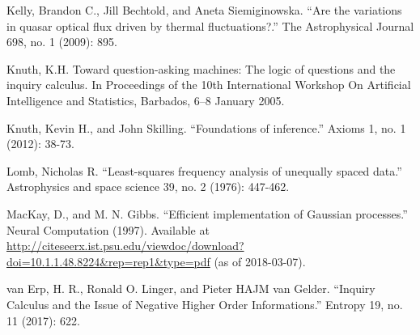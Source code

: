 \documentclass[a4paper, 12pt]{article}
\begin{document}
\begin{thebibliography}{999}
Kelly, Brandon C., Jill Bechtold, and Aneta Siemiginowska. ``Are the variations in quasar optical flux driven by thermal fluctuations?.'' The Astrophysical Journal 698, no. 1 (2009): 895.

Knuth, K.H. Toward question-asking machines: The logic of questions and the inquiry calculus. In
Proceedings of the 10th International Workshop On Artificial Intelligence and Statistics, Barbados, 6–8
January 2005.

Knuth, Kevin H., and John Skilling. ``Foundations of inference.''
Axioms 1, no. 1 (2012): 38-73.

Lomb, Nicholas R. ``Least-squares frequency analysis of unequally spaced data.'' Astrophysics and space science 39, no. 2 (1976): 447-462.

MacKay, D., and M. N. Gibbs. ``Efficient implementation of Gaussian processes.'' Neural Computation (1997).
Available at \url{http://citeseerx.ist.psu.edu/viewdoc/download?doi=10.1.1.48.8224&rep=rep1&type=pdf}
(as of 2018-03-07).

van Erp, H. R., Ronald O. Linger, and Pieter HAJM van Gelder. ``Inquiry Calculus and the Issue of Negative Higher Order Informations.'' Entropy 19, no. 11 (2017): 622.

\end{thebibliography}
\end{document}
